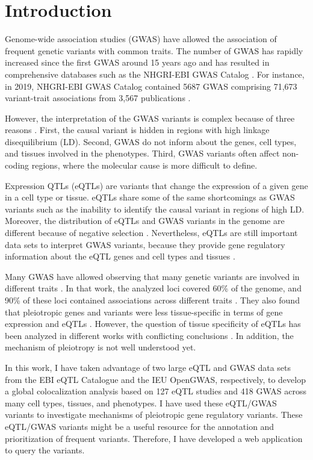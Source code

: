 \section*{Introduction}\label{sec:introduction}

Genome-wide association studies (GWAS) have allowed the association of frequent genetic variants with common traits.
%
The number of GWAS has rapidly increased since the first GWAS around 15 years ago and has resulted in comprehensive databases such as the NHGRI-EBI GWAS Catalog \citep{2007...Nature,2018.Parkinson.Buniello}.
%
For instance, in 2019, NHGRI-EBI GWAS Catalog contained 5687 GWAS comprising 71,673 variant-trait associations from 3,567 publications \citep{2018.Parkinson.Buniello}.

However, the interpretation of the GWAS variants is complex because of three reasons \citep{2020.Trynka.CanoGamez}.
%
First, the causal variant is hidden in regions with high linkage disequilibrium (LD).
%
Second, GWAS do not inform about the genes, cell types, and tissues involved in the phenotypes.
%
Third, GWAS variants often affect non-coding regions, where the molecular cause is more difficult to define.

Expression QTLs (eQTLs) are variants that change the expression of a given gene in a cell type or tissue.
%
eQTLs share some of the same shortcomings as GWAS variants such as the inability to identify the causal variant in regions of high LD.
%
Moreover, the distribution of eQTLs and GWAS variants in the genome are different because of negative selection \citep{2022.Pritchard.Mostafavi}.
%
Nevertheless, eQTLs are still important data sets to interpret GWAS variants, because they provide gene regulatory information about the eQTL genes and cell types and tissues \citep{2021.Li.Mu}.
%

Many GWAS have allowed observing that many genetic variants are involved in different traits \citep{2019.Posthuma.Watanabe}.
%
In that work, the analyzed loci covered 60\% of the genome, and 90\% of these loci contained associations across different traits \citep{2019.Posthuma.Watanabe}.
%
They also found that pleiotropic genes and variants were less tissue-specific in terms of gene expression and eQTLs \citep{2019.Posthuma.Watanabe}.
%
However, the question of tissue specificity of eQTLs has been analyzed in different works with conflicting conclusions \citep{2021.Li.Mu,2018.Vijayanand.Schmiedel,2017gtex.nature}.
%
In addition, the mechanism of pleiotropy is not well understood yet.

In this work, I have taken advantage of two large eQTL and GWAS data sets from the EBI eQTL Catalogue and the IEU OpenGWAS, respectively,
to develop a global colocalization analysis based on 127 eQTL studies and 418 GWAS across many cell types, tissues, and phenotypes.
%
I have used these eQTL/GWAS variants to investigate mechanisms of pleiotropic gene regulatory variants.
%
These eQTL/GWAS variants might be a useful resource for the annotation and prioritization of frequent variants.
%
Therefore, I have developed a web application to query the variants.
